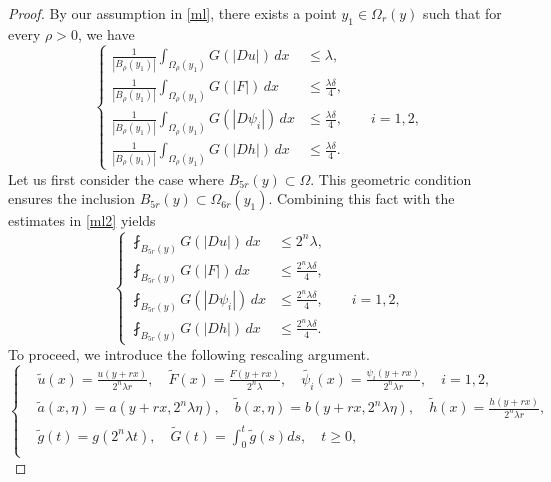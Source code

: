 \documentclass[10pt,a4paper]{amsart}
\begin{document}
 \begin{proof}
 	By our assumption in \eqref{ml}, there exists a point $y_1 \in \Omega_r(y)$ such that for every $\rho > 0$, we have
  \begin{equation}\label{ml2}
  	\left\{
  	\begin{aligned}
  		\frac{1}{|B_\rho(y_1)|}
  		\int_{\Omega_\rho(y_1)}G(|Du|)\,dx
  		&\leq \lambda, \\[0.15cm]
  		\frac{1}{|B_\rho(y_1)|}
  		\int_{\Omega_\rho(y_1)}G(|F|)\,dx
  		&\leq \frac{\lambda\delta}{4}, \\[0.15cm]
  		\frac{1}{|B_\rho(y_1)|}
  		\int_{\Omega_\rho(y_1)}G(|D\psi_i|)\,dx
  		&\leq \frac{\lambda\delta}{4},	\qquad i=1,2,  \\[0.15cm]
  		\frac{1}{|B_\rho(y_1)|}
  		\int_{\Omega_\rho(y_1)}G(|Dh|)\,dx
  		&\leq \frac{\lambda\delta}{4}.
  	\end{aligned}
  	\right.
  \end{equation}
 	Let us first consider the case where $B_{5r}(y) \subset \Omega$. This geometric condition ensures the inclusion $B_{5r}(y) \subset \Omega_{6r}(y_1)$. Combining this fact with the estimates in \eqref{ml2} yields
 	\begin{equation}\label{ml3}
 		\left\{
 		\begin{aligned}
 				\fint_{B_{5r}(y)} G(|Du|) \, dx  &\leq 2^n \lambda,  \\[0.15cm]
 		 \fint_{B_{5r}(y)} G(|F|) \, dx &\leq \frac{ 2^n \lambda \delta}{4}, \\[0.15cm]
 		  \fint_{B_{5r}(y)} G(|D\psi_i|) \, dx &\leq \frac{ 2^n \lambda \delta}{4},	\qquad i=1,2,  \\[0.15cm]
 		\fint_{B_{5r}(y)} G(|Dh|) \, dx &\leq \frac{ 2^n \lambda \delta}{4}.
 		\end{aligned}
 		\right.
 	\end{equation}
 	To proceed, we introduce the following rescaling argument.
 		\begin{equation*} 
 		\left\{
 		\begin{aligned}
 			 	&\tilde{u}(x) = \frac{u(y + rx)}{2^n \lambda r}, \quad \tilde{F}(x) = \frac{F(y + rx)}{2^n \lambda},  \quad \tilde{\psi_i}(x) = \frac{\psi_i(y + rx)}{2^n \lambda r}, \quad  i=1,2, \\[0.15cm]
 			 	&\tilde{a}(x,\eta) = a(y + rx,2^n \lambda \eta), \quad 	\tilde{b}(x,\eta) = b(y + rx,2^n \lambda \eta), \quad \tilde{h}(x) = \frac{h(y + rx)}{2^n \lambda r},   \\[0.15cm]
 		&\tilde{g}(t) = g(2^n \lambda t), \quad \tilde{G}(t) =\int_0^t \tilde{g}(s) ds, \quad t \geq 0, \\[0.15cm]

\end{aligned}
\end{equation*}
\end{proof}
\end{document}
